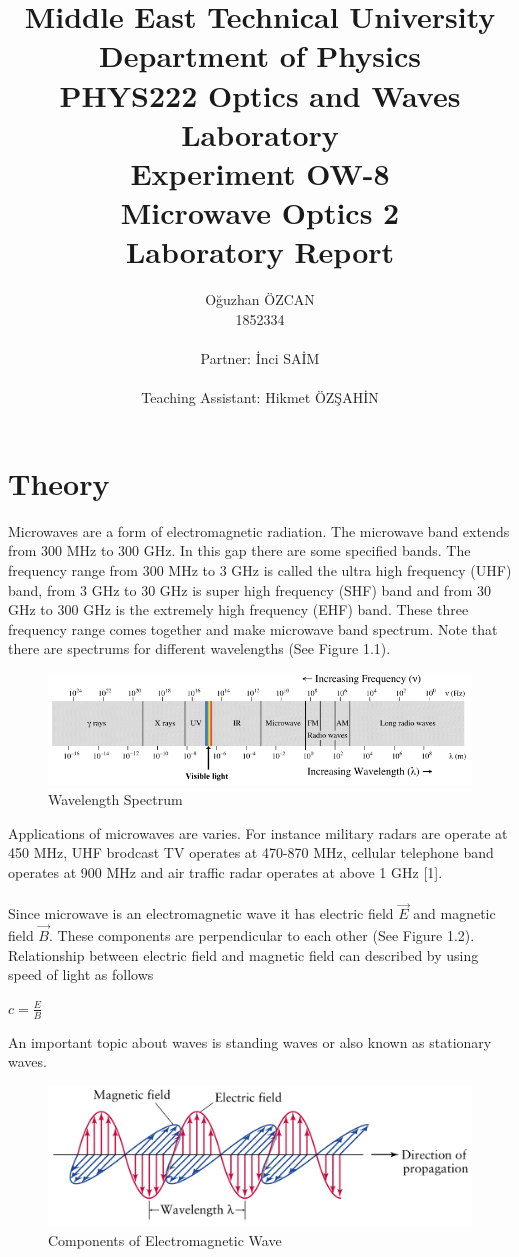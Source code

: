 \documentclass[a4paper,12pt]{report}
\title{Middle East Technical University\\Department of Physics\\PHYS222 Optics and Waves Laboratory\\\textbf{Experiment OW-8\\Microwave Optics 2\\Laboratory Report}}
\author{Oğuzhan ÖZCAN\\1852334\\\\Partner: İnci SAİM\\\\Teaching Assistant: Hikmet ÖZŞAHİN}
\begin{document}
\maketitle
\tableofcontents
\listoffigures
\listoftables
\chapter{Theory}
Microwaves are a form of electromagnetic radiation. The microwave band extends from 300 MHz to 300 GHz. In this gap there are some specified bands. The frequency range from 300 MHz to 3 GHz is called the ultra high frequency (UHF) band, from 3 GHz to 30 GHz is super high frequency (SHF) band and from 30 GHz to 300 GHz is the extremely high frequency (EHF) band. These three frequency range comes together and make microwave band spectrum. Note that there are spectrums for different wavelengths (See Figure 1.1).
\begin{figure}[h]
\centering
\includegraphics[width=1.0\linewidth, height=0.22\textheight]{spectrum}
\caption{Wavelength Spectrum}
\label{fig:spectrum}
\end{figure}
Applications of microwaves are varies. For instance military radars are operate at 450 MHz, UHF brodcast TV operates at 470-870 MHz, cellular telephone band operates at 900 MHz and air traffic radar operates at above 1 GHz [1].\\\\
Since microwave is an electromagnetic wave it has electric field $\vec{E}$ and magnetic field $\vec{B}$. These components are perpendicular to each other (See Figure 1.2). Relationship between electric field and magnetic field can described by using speed of light as follows
\begin{center}
	{\large $c=\frac{E}{B}$}
\end{center}
An important topic about waves is standing waves or also known as stationary waves.
\begin{figure}[h]
\centering
\includegraphics[width=1.0\linewidth, height=0.23\textheight]{em}
\caption{Components of Electromagnetic Wave}
\label{fig:em}
\end{figure}
\end{document}
